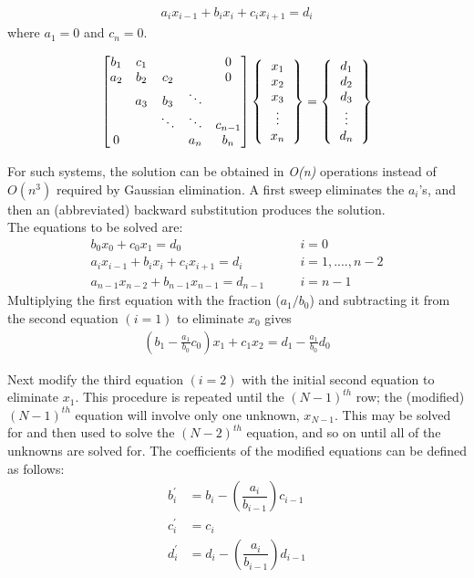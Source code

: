 \documentclass[book.tex]{subfiles}
\begin{document}
\begin{align}
a_ix_{i-1} + b_ix_i + c_ix_{i+1} = d_i
\end{align}
where $a_1 = 0$ and $c_n = 0$. 
\begin{margintable}
\[
\begin{bmatrix}
b_1 & c_1 &  &  & 0\\ 
a_2 & b_2 & c_2 &  & 0 \\ 
  & a_3 & b_3 & \ddots & \\
 &  & \ddots & \ddots & c_{n-1}\\
0  &  &  & a_n & b_n
\end{bmatrix} 
\left \{
\begin{tabular}{c}
$x_1$ \\
$x_2$ \\
$x_3$  \\
$\vdots$ \\
$x_n$
\end{tabular}
\right \}
=
\left \{
\begin{tabular}{c}
$d_1$ \\
$d_2$ \\
$d_3$ \\ 
$\vdots$\\
$d_n$
\end{tabular}
\right \}
\]
\end{margintable}
For such systems, the solution can be obtained in \textit{O(n)} operations instead of \textit{$O(n^3)$} required by Gaussian elimination. A first sweep eliminates the $a_i$'s, and then an (abbreviated) backward substitution produces the solution.\\
The equations to be solved are:
\begin{align}
 b_0 x_0 + c_0x_1 = d_0 \qquad &i = 0\\
a_ix_{i-1} + b_ix_i + c_ix_{i+1} = d_i \qquad &i = 1,....,n-2\\
a_{n-1}x_{n-2} + b_{n-1}x_{n-1} = d_{n-1}\qquad  &i = n - 1
\end{align}
Multiplying the first equation with the fraction ($a_1/b_0$) and subtracting it from the second equation $(i = 1)$ to eliminate $x_0$ gives 
\begin{align}
\left (b_1 - \frac{a_1}{b_0}c_0\right )x_1 + c_1x_2 = d_1 - \frac{a_1}{b_0}d_0
\end{align}


Next modify the third equation $(i = 2)$ with the initial second equation to eliminate $x_1$. This procedure is repeated until the $(N-1)^{th}$ row; the (modified) $(N-1)^{th}$ equation will involve only one unknown, $x_{N-1}$. This may be solved for and then used to solve the $(N-2)^{th}$ equation, and so on until all of the unknowns are solved for. The coefficients of the modified equations can be defined as follows:
\begin{align}
b_i^{'} &= b_i - \left (\dfrac{a_i}{b_{i-1}}\right )c_{i-1}\\
c_i^{'} &= c_i\\
d_i^{'} &= d_i - \left (\dfrac{a_i}{b_{i-1}}\right )d_{i-1}
\end{align}
\end{document}
